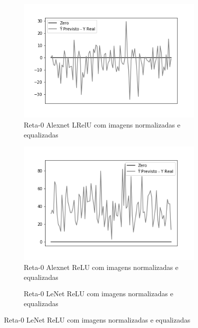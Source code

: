 \begin{figure}[hb!]
	\caption{Redes neurais biológicas.}
	\begin{subfigure}[hb]{0.5\linewidth}
		\caption{Reta-0 Alexnet LRelU com imagens normalizadas e equalizadas}
		\label{fig:histalexlrelunorm}
		\includegraphics[width=\linewidth]{img/graficos-fase2/fig-reta-0-alexnet-lrelu-data-augmentation-22.png}
	\end{subfigure}%
	\begin{subfigure}[hb]{0.5\linewidth}
		\caption{Reta-0 Alexnet ReLU com imagens normalizadas e equalizadas}
		\label{fig:redeneuralbiologica}
		\includegraphics[width=\linewidth]{img/graficos-fase2/fig-reta-0-alexnet-relu-data-augmentation-21.png}
	\end{subfigure}%
  \begin{subfigure}[hb]{0.5\linewidth}
    \caption{Reta-0 LeNet ReLU com imagens normalizadas e equalizadas}

\end{subfigure}
\end{figure}

